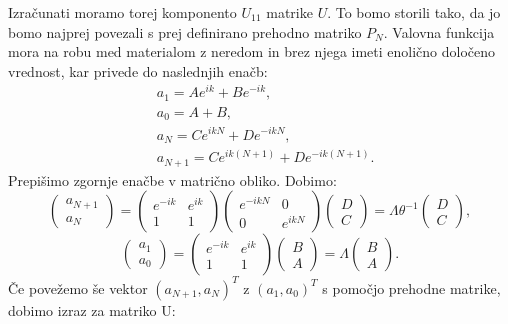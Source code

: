 \begin{appendices}
Izračunati moramo torej komponento $U_{11}$ matrike $U$. To bomo storili tako, da jo bomo najprej povezali s prej definirano prehodno matriko $P_N$.
Valovna funkcija mora na robu med materialom z neredom in brez njega imeti enolično določeno vrednost, kar privede do naslednjih enačb:
\begin{align}
&a_1 = Ae^{ik} + Be^{-ik}, \\
&a_0 = A+B, \\
&a_N = C e^{ikN} + D e^{-ikN}, \\
&a_{N+1} = C e^{ik(N+1)} + De^{-ik(N+1)}.
\end{align}
Prepišimo zgornje enačbe v matrično obliko. Dobimo:
\begin{equation}
\begin{pmatrix} a_{N+1} \\ a_N \end{pmatrix} = 
\begin{pmatrix} e^{-ik} & e^{ik} \\ 1 & 1 \end{pmatrix} \begin{pmatrix} e^{-ikN} & 0 \\ 0 & e^{ikN} \end{pmatrix} \begin{pmatrix} D \\ C \end{pmatrix} =
\Lambda \theta^{-1} \begin{pmatrix} D \\ C \end{pmatrix},
\end{equation}
\begin{equation}
\begin{pmatrix} a_1  \\ a_0 \end{pmatrix} = \begin{pmatrix} e^{-ik} &  e^{ik} \\ 1 & 1 \end{pmatrix} \begin{pmatrix} B \\ A \end{pmatrix} = \Lambda \begin{pmatrix} B \\ A \end{pmatrix}.
\end{equation}
Če povežemo še vektor $(a_{N+1}, a_N)^T$ z $(a_1, a_0)^T$ s pomočjo prehodne matrike, dobimo izraz za matriko U:
\begin{equation}

\end{equation}
\end{appendices}
